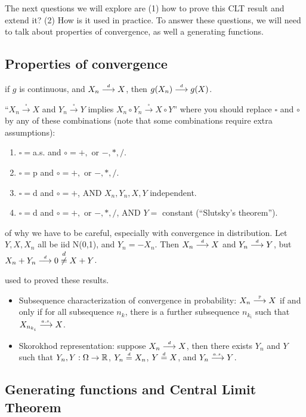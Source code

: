 \documentclass{article}
\begin{document}
The next questions we will explore are (1) how to prove this CLT result and extend it? (2) How is it used in practice. To answer these questions, we will need to talk about properties of convergence, as well a generating functions.


\subsection{Properties of convergence}

 if $g$ is continuous, and $X_n \stackrel{\scriptscriptstyle d}{\longrightarrow} X$, then $g(X_n) \stackrel{\scriptscriptstyle d}{\longrightarrow} g(X)$.

 ``$X_n \stackrel{\square}{\longrightarrow} X$ and $Y_n \stackrel{\square}{\longrightarrow} Y$ implies $X_n \circ Y_n \stackrel{\square}{\longrightarrow} X \circ Y$'' where you should replace $\square$ and $\circ$ by any of these combinations (note that some combinations require extra assumptions):
\begin{enumerate}
  \item $\square = $a.s. and $\circ = +,$ or $-, *, /$.
  \item $\square = $p and $\circ = +,$ or $-, *, /$.
  \item $\square = $d and $\circ = +$, AND $X_n, Y_n, X, Y$ independent.
  \item $\square = $d and $\circ = +,$ or $-, *, /$, AND $Y = $ constant (``Slutsky's theorem'').
\end{enumerate}

 of why we have to be careful, especially with convergence in distribution. Let $Y, X, X_n$ all be iid N(0,1), and $Y_n = -X_n$. Then $X_n \stackrel{\scriptscriptstyle d}{\longrightarrow} X$ and $Y_n \stackrel{\scriptscriptstyle d}{\longrightarrow} Y$, but $X_n + Y_n \stackrel{\scriptscriptstyle d}{\longrightarrow} 0 \stackrel{d}{\neq} X+Y$.

 used to proved these results.
\begin{itemize}
  \item Subsequence characterization of convergence in probability: $X_n \stackrel{\scriptscriptstyle {\mathbb P}}{\longrightarrow} X$ if and only if for all subsequence $n_k$, there is a further subsequence $n_{k_i}$ such that $X_{n_{k_i}} \stackrel{\scriptscriptstyle a.s.}{\longrightarrow} X$.
  \item Skorokhod representation: suppose $X_n \stackrel{\scriptscriptstyle d}{\longrightarrow} X$, then there exists $Y_n$ and $Y$ such that $Y_n, Y: \Omega \to {\mathbb R}$, $Y_n \stackrel{\scriptscriptstyle d}{=} X_n$, $Y \stackrel{\scriptscriptstyle d}{=} X$, and $Y_n \stackrel{\scriptscriptstyle a.s.}{\longrightarrow} Y$.
\end{itemize}

\subsection{Generating functions and Central Limit Theorem} 
\end{document}
